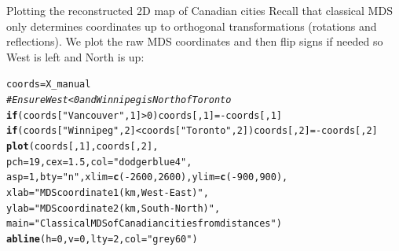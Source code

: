 \documentclass[aspectratio=169]{beamer}\usepackage[]{graphicx}\usepackage[]{xcolor}
\makeatletter
\newcommand{\hlnum}[1]{\textcolor[rgb]{0.686,0.059,0.569}{#1}}%
\newcommand{\hlsng}[1]{\textcolor[rgb]{0.192,0.494,0.8}{#1}}%
\newcommand{\hlcom}[1]{\textcolor[rgb]{0.678,0.584,0.686}{\textit{#1}}}%
\newcommand{\hlopt}[1]{\textcolor[rgb]{0,0,0}{#1}}%
\newcommand{\hldef}[1]{\textcolor[rgb]{0.345,0.345,0.345}{#1}}%
\newcommand{\hlkwa}[1]{\textcolor[rgb]{0.161,0.373,0.58}{\textbf{#1}}}%
\newcommand{\hlkwb}[1]{\textcolor[rgb]{0.69,0.353,0.396}{#1}}%
\newcommand{\hlkwc}[1]{\textcolor[rgb]{0.333,0.667,0.333}{#1}}%
\newcommand{\hlkwd}[1]{\textcolor[rgb]{0.737,0.353,0.396}{\textbf{#1}}}%
\newenvironment{kframe}{%
 \def\at@end@of@kframe{}%
 \ifinner\ifhmode%
  \def\at@end@of@kframe{\end{minipage}}%
  \begin{minipage}{\columnwidth}%
 \fi\fi%
 \def\FrameCommand##1{\hskip\@totalleftmargin \hskip-\fboxsep
 \colorbox{shadecolor}{##1}\hskip-\fboxsep
     \hskip-\linewidth \hskip-\@totalleftmargin \hskip\columnwidth}%
 \MakeFramed {\advance\hsize-\width
   \@totalleftmargin\z@ \linewidth\hsize
   \@setminipage}}%
 {\par\unskip\endMakeFramed%
 \at@end@of@kframe}
\newenvironment{knitrout}{}{} %
\makeatother
\begin{document}
\begin{frame}[fragile]{Plotting the reconstructed 2D map of Canadian cities}
Recall that classical MDS only determines coordinates up to orthogonal transformations (rotations and reflections). We plot the raw MDS coordinates and then flip signs if needed so West is left and North is up:
\vfill
\begin{knitrout}
\color{fgcolor}\begin{kframe}
\begin{alltt}
\hldef{coords} \hlkwb{=} \hldef{X_manual}
\hlcom{# Ensure West < 0 and Winnipeg is North of Toronto}
\hlkwa{if} \hldef{(coords[}\hlsng{"Vancouver"}\hldef{,} \hlnum{1}\hldef{]} \hlopt{>} \hlnum{0}\hldef{) coords[,} \hlnum{1}\hldef{]} \hlkwb{=} \hlopt{-}\hldef{coords[,} \hlnum{1}\hldef{]}
\hlkwa{if} \hldef{(coords[}\hlsng{"Winnipeg"}\hldef{,} \hlnum{2}\hldef{]} \hlopt{<} \hldef{coords[}\hlsng{"Toronto"}\hldef{,} \hlnum{2}\hldef{]) coords[,} \hlnum{2}\hldef{]} \hlkwb{=} \hlopt{-}\hldef{coords[,} \hlnum{2}\hldef{]}
\hlkwd{plot}\hldef{(coords[,} \hlnum{1}\hldef{], coords[,} \hlnum{2}\hldef{],}
     \hlkwc{pch} \hldef{=} \hlnum{19}\hldef{,} \hlkwc{cex} \hldef{=} \hlnum{1.5}\hldef{,} \hlkwc{col} \hldef{=} \hlsng{"dodgerblue4"}\hldef{,}
     \hlkwc{asp} \hldef{=} \hlnum{1}\hldef{,} \hlkwc{bty} \hldef{=} \hlsng{"n"}\hldef{,} \hlkwc{xlim} \hldef{=} \hlkwd{c}\hldef{(}\hlopt{-}\hlnum{2600}\hldef{,} \hlnum{2600}\hldef{),} \hlkwc{ylim} \hldef{=} \hlkwd{c}\hldef{(}\hlopt{-}\hlnum{900}\hldef{,} \hlnum{900}\hldef{),}
     \hlkwc{xlab} \hldef{=} \hlsng{"MDS coordinate 1 (km, West - East)"}\hldef{,}
     \hlkwc{ylab} \hldef{=} \hlsng{"MDS coordinate 2 (km, South - North)"}\hldef{,}
     \hlkwc{main} \hldef{=} \hlsng{"Classical MDS of Canadian cities from distances"}\hldef{)}
\hlkwd{abline}\hldef{(}\hlkwc{h} \hldef{=} \hlnum{0}\hldef{,} \hlkwc{v} \hldef{=} \hlnum{0}\hldef{,} \hlkwc{lty} \hldef{=} \hlnum{2}\hldef{,} \hlkwc{col} \hldef{=} \hlsng{"grey60"}\hldef{)}
\end{alltt}
\end{kframe}
\end{knitrout}
\end{frame}

\end{document}
